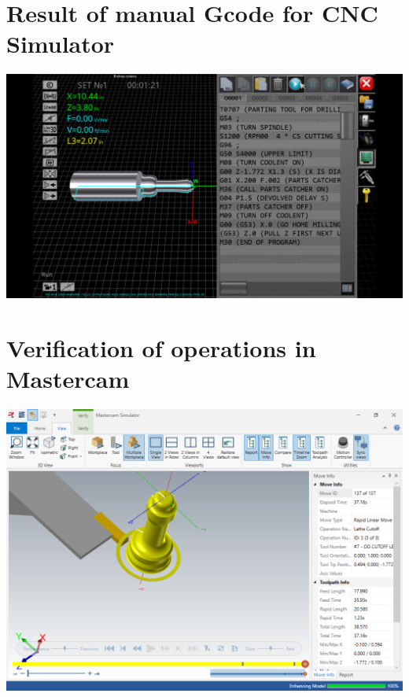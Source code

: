 \documentclass{report}
\begin{document}
\chapter{Result of manual Gcode for CNC Simulator}
\begin{landscape}
\null\vfill
\includegraphics[width=\linewidth]{img/prj05-cnc_simulator_result.png}
\vfill
\end{landscape}

\chapter{Verification of operations in Mastercam}
\begin{landscape}
\vfill
\includegraphics[width=\linewidth]{img/prj05-mastercam_simulator-verification.png}
\vfill
\end{landscape}
\end{document}
